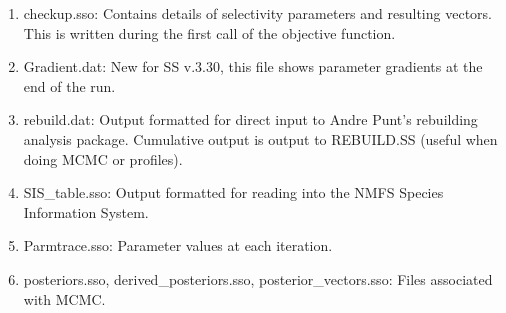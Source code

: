 \begin{enumerate}
		\item checkup.sso: Contains details of selectivity parameters and resulting vectors.  This is written during the first call of the objective function.
		\item Gradient.dat: New for SS v.3.30, this file shows parameter gradients at the end of the run.
		\item rebuild.dat: Output formatted for direct input to Andre Punt's rebuilding analysis package.  Cumulative output is output to REBUILD.SS (useful when doing MCMC or profiles).
		\item SIS\_table.sso: Output formatted for reading into the NMFS Species Information System.
		\item Parmtrace.sso: Parameter values at each iteration.
		\item posteriors.sso, derived\_posteriors.sso, posterior\_vectors.sso: Files associated with MCMC.
	\end{enumerate}

	
